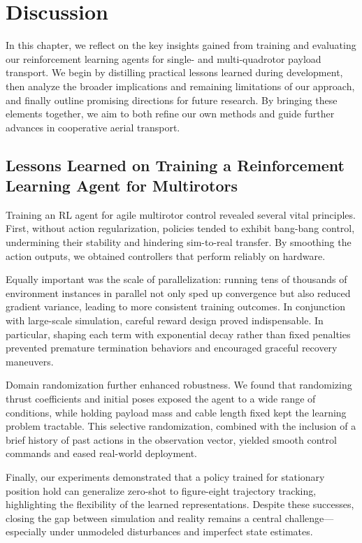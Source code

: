 \chapter{Discussion}

In this chapter, we reflect on the key insights gained from training and evaluating our reinforcement learning agents for single- and multi-quadrotor payload transport. We begin by distilling practical lessons learned during development, then analyze the broader implications and remaining limitations of our approach, and finally outline promising directions for future research. By bringing these elements together, we aim to both refine our own methods and guide further advances in cooperative aerial transport.

\section{Lessons Learned on Training a Reinforcement Learning Agent for Multirotors}

Training an RL agent for agile multirotor control revealed several vital principles.  First, without action regularization, policies tended to exhibit bang-bang control, undermining their stability and hindering sim-to-real transfer.  By smoothing the action outputs, we obtained controllers that perform reliably on hardware.

Equally important was the scale of parallelization: running tens of thousands of environment instances in parallel not only sped up convergence but also reduced gradient variance, leading to more consistent training outcomes.  In conjunction with large-scale simulation, careful reward design proved indispensable.  In particular, shaping each term with exponential decay rather than fixed penalties prevented premature termination behaviors and encouraged graceful recovery maneuvers.

Domain randomization further enhanced robustness.  We found that randomizing thrust coefficients and initial poses exposed the agent to a wide range of conditions, while holding payload mass and cable length fixed kept the learning problem tractable.  This selective randomization, combined with the inclusion of a brief history of past actions in the observation vector, yielded smooth control commands and eased real-world deployment.

Finally, our experiments demonstrated that a policy trained for stationary position hold can generalize zero-shot to figure-eight trajectory tracking, highlighting the flexibility of the learned representations.  Despite these successes, closing the gap between simulation and reality remains a central challenge—especially under unmodeled disturbances and imperfect state estimates.

